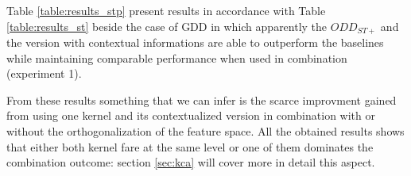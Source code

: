 Table \ref{table:results_stp} present results in accordance with Table \ref{table:results_st}
beside the case of GDD in which apparently the $ODD_{ST+}$ and the version with
contextual informations are able to outperform the baselines while maintaining
comparable performance when used in combination (experiment 1).

From these results something that we can infer is the scarce improvment gained from
using one kernel and its contextualized version in combination with or without
the orthogonalization of the feature space.
All the obtained results shows that either both kernel fare at the same level or
one of them dominates the combination outcome: section \ref{sec:kca} will cover
more in detail this aspect.

\begin{landscape}


\end{landscape}
